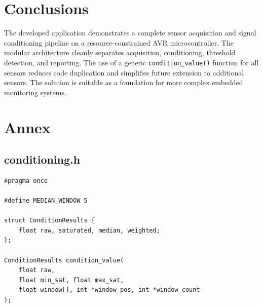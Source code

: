 \documentclass[12pt,a4paper]{article}
\begin{document}
\section{Conclusions}

The developed application demonstrates a complete sensor acquisition and signal conditioning
pipeline on a resource-constrained AVR microcontroller. The modular architecture cleanly
separates acquisition, conditioning, threshold detection, and reporting. The use of a generic
\texttt{condition\_value()} function for all sensors reduces code duplication and simplifies
future extension to additional sensors. The solution is suitable as a foundation for more
complex embedded monitoring systems.

\newpage
\section{Annex}

\subsection{conditioning.h}
\begin{lstlisting}
#pragma once

#define MEDIAN_WINDOW 5

struct ConditionResults {
    float raw, saturated, median, weighted;
};

ConditionResults condition_value(
    float raw,
    float min_sat, float max_sat,
    float window[], int *window_pos, int *window_count
);
\end{lstlisting}
\end{document}
